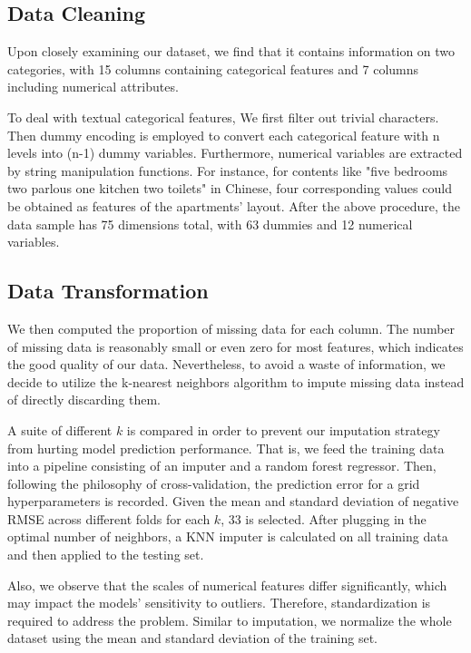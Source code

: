 \documentclass[11pt,a4paper]{article}
\begin{document}
    \subsection{Data Cleaning}
   Upon closely examining our dataset, we find that it contains information on two categories, with 15 columns containing categorical features and 7 columns including numerical attributes.

   To deal with textual categorical features, We first filter out trivial characters. Then dummy encoding is employed to convert each categorical feature with n levels into (n-1) dummy variables. Furthermore, numerical variables are extracted by string manipulation functions. For instance, for contents like "five bedrooms two parlous one kitchen two toilets" in Chinese, four corresponding values could be obtained as features of the apartments' layout. After the above procedure, the data sample has 75 dimensions total, with 63 dummies and 12 numerical variables.     


\subsection{Data Transformation}
We then computed the proportion of missing data for each column. The number of missing data is reasonably small or even zero for most features, which indicates the good quality of our data. Nevertheless, to avoid a waste of information, we decide to utilize the k-nearest neighbors algorithm to impute missing data instead of directly discarding them. 

A suite of different $k$ is compared in order to prevent our imputation strategy from hurting model prediction performance. That is, we feed the training data into a pipeline consisting of an imputer and a random forest regressor. Then, following the philosophy of cross-validation, the prediction error for a grid hyperparameters is recorded. Given the mean and standard deviation of negative RMSE across different folds for each $k$, 33 is selected. After plugging in the optimal number of neighbors, a KNN imputer is calculated on all training data and then applied to the testing set. 

Also, we observe that the scales of numerical features differ significantly, which may impact the models' sensitivity to outliers. Therefore, standardization is required to address the problem. Similar to imputation, we normalize the whole dataset using the mean and standard deviation of the training set.
 
\end{document}

